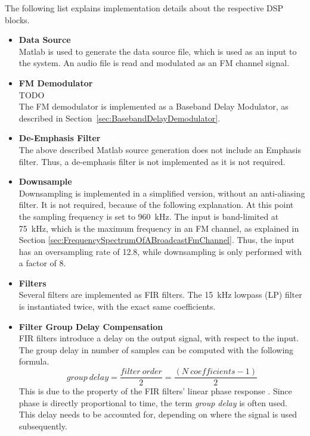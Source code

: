 \noindent
The following list explains implementation details about the respective DSP blocks.
\begin{itemize}
  \item \textbf{Data Source}\\
      Matlab is used to generate the data source file, which is used as an input to the system.
      An audio file is read and modulated as an FM channel signal.

  \item \textbf{FM Demodulator}\\
       TODO\\
      The FM demodulator is implemented as a Baseband Delay Modulator, as described in Section~\ref{sec:BasebandDelayDemodulator}.

  \item \textbf{De-Emphasis Filter}\\
      The above described Matlab source generation does not include an Emphasis filter.
      Thus, a de-emphasis filter is not implemented as it is not required.

  \item \textbf{Downsample}\\
      Downsampling is implemented in a simplified version, without an anti-aliasing filter.
      It is not required, because of the following explanation.
      At this point the sampling frequency is set to 960~kHz.
      The input is band-limited at 75~kHz, which is the maximum frequency in an FM channel, as explained in Section \ref{sec:FrequencySpectrumOfABroadcastFmChannel}.
      Thus, the input has an oversampling rate of 12.8, while downsampling is only performed with a factor of 8.

  \item \textbf{Filters}\\
      Several filters are implemented as FIR filters.
      The 15~kHz lowpass (LP) filter is instantiated twice, with the exact same coefficients.

  \item \textbf{Filter Group Delay Compensation}\\
      FIR filters introduce a delay on the output signal, with respect to the input.
      The group delay in number of samples can be computed with the following formula.
      \begin{equation}
        group\ delay = \frac{filter\ order}{2} = \frac{(N\ coefficients - 1)}{2}
      \end{equation}
      This is due to the property of the FIR filters' linear phase response \cite{GaziOrhan2018UDSP}.
      Since phase is directly proportional to time, the term \textit{group delay} is often used.
      This delay needs to be accounted for, depending on where the signal is used subsequently.


\end{itemize}

